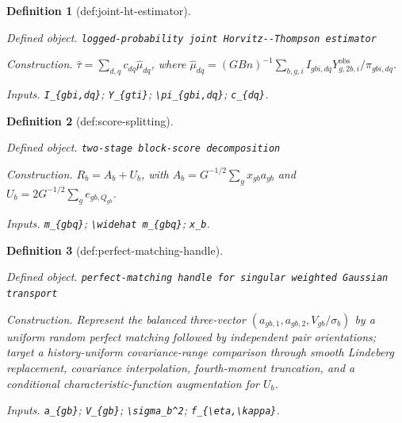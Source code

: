 \documentclass{article}
\newtheorem{definition}{Definition}
\begin{document}
\begin{definition}[def:joint-ht-estimator]\label{def:joint-ht-estimator}
\par\smallskip\noindent\emph{Defined object.} \texttt{logged-\allowbreak{}probability joint Horvitz-\allowbreak{}-\allowbreak{}Thompson estimator}
\par\smallskip\noindent\emph{Construction.} \(\widehat\tau=\sum_{d,q}c_{dq}\widehat\mu_{dq}\), where \(\widehat\mu_{dq}=(GBn)^{-1}\sum_{b,g,i}I_{gbi,dq}Y^{\mathrm{obs}}_{g,2b,i}/\pi_{gbi,dq}\).
\par\smallskip\noindent\emph{Inputs.} \texttt{I\_\allowbreak{}\{gbi,\allowbreak{}dq\}\allowbreak{}}; \texttt{Y\_\allowbreak{}\{gti\}\allowbreak{}}; \texttt{\textbackslash{}\allowbreak{}pi\_\allowbreak{}\{gbi,\allowbreak{}dq\}\allowbreak{}}; \texttt{c\_\allowbreak{}\{dq\}\allowbreak{}}.
\end{definition}

\begin{definition}[def:score-splitting]\label{def:score-splitting}
\par\smallskip\noindent\emph{Defined object.} \texttt{two-\allowbreak{}stage block-\allowbreak{}score decomposition}
\par\smallskip\noindent\emph{Construction.} \(R_b=A_b+U_b\), with \(A_b=G^{-1/2}\sum_gx_{gb}a_{gb}\) and \(U_b=2G^{-1/2}\sum_ge_{gb,Q_{gb}}\).
\par\smallskip\noindent\emph{Inputs.} \texttt{m\_\allowbreak{}\{gbq\}\allowbreak{}}; \texttt{\textbackslash{}\allowbreak{}widehat m\_\allowbreak{}\{gbq\}\allowbreak{}}; \texttt{x\_\allowbreak{}b}.
\end{definition}

\begin{definition}[def:perfect-matching-handle]\label{def:perfect-matching-handle}
\par\smallskip\noindent\emph{Defined object.} \texttt{perfect-\allowbreak{}matching handle for singular weighted Gaussian transport}
\par\smallskip\noindent\emph{Construction.} Represent the balanced three-vector \((a_{gb,1},a_{gb,2},V_{gb}/\sigma_b)\) by a uniform random perfect matching followed by independent pair orientations; target a history-uniform covariance-range comparison through smooth Lindeberg replacement, covariance interpolation, fourth-moment truncation, and a conditional characteristic-function augmentation for \(U_b\).
\par\smallskip\noindent\emph{Inputs.} \texttt{a\_\allowbreak{}\{gb\}\allowbreak{}}; \texttt{V\_\allowbreak{}\{gb\}\allowbreak{}}; \texttt{\textbackslash{}\allowbreak{}sigma\_\allowbreak{}b\textasciicircum{}2}; \texttt{f\_\allowbreak{}\{\textbackslash{}\allowbreak{}eta,\allowbreak{}\textbackslash{}\allowbreak{}kappa\}\allowbreak{}}.
\end{definition}
\end{document}
